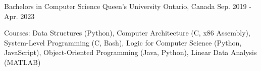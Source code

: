 

\begin{cventries}

  \cventry
    {Bachelors in Computer Science} %
    {Queen's University} %
    {Ontario, Canada} %
    {Sep. 2019 - Apr. 2023} %
    {
      \begin{cvitems} %
        \item {Courses: Data Structures (Python), Computer Architecture (C, x86 Assembly), System-Level Programming (C, Bash), Logic for Computer Science (Python, JavaScript), Object-Oriented Programming (Java, Python), Linear Data Analysis (MATLAB)}
      \end{cvitems}
    }

\end{cventries}
